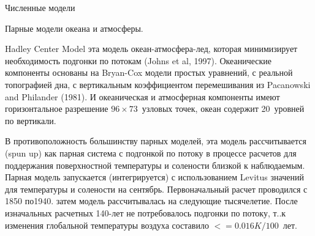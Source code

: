 \begin{chapter}{Численные модели}
\begin{section}{Парные модели океана и атмосферы.}
\begin{paragraph}{Hadley Center Model}
эта модель океан-атмосфера-лед, которая минимизирует необходимость
подгонки по потокам (Johns et al, 1997). Океанические компоненты
основаны на Bryan-Cox модели простых уравнений, с реальной топографией
дна, с вертикальным коэффициентом перемешивания из Pacanowski and
Philander (1981). И океаническая и атмосферная компоненты имеют
горизонтальное разрешение $96\times 73$~узловых точек, океан содержит
20~уровней по вертикали.
%

В противоположность большинству парных моделей, эта модель
рассчитывается (spun up) как парная система с подгонкой по потоку в
процессе расчетов для поддержания поверхностной температуры и
солености близкой к наблюдаемым. Парная модель запускается
(интегрируется) с использованием Levitus значений для температуры и
солености на сентябрь. Первоначальный расчет проводился с 1850
по1940. затем модель рассчитывалась на следующие тысячелетие. После
изначальных расчетных 140-лет не потребовалось подгонки по потоку,
т..к изменения глобальной температуры воздуха составило $<= 0.016 K /
100$~лет.
%
\end{paragraph}


\end{section}
\end{chapter}

